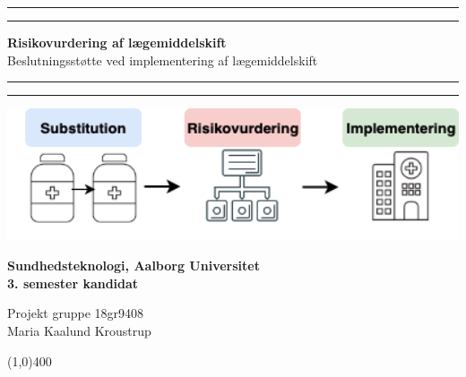 \clearpage
\thispagestyle{empty}


\begin{center}	
	\rule{\textwidth}{1.6pt}\vspace*{-\baselineskip}\vspace*{2pt} %
	\rule{\textwidth}{0.4pt} %
	
	\vspace{1.2\baselineskip} %
	
	{\Huge \textbf{Risikovurdering af lægemiddelskift}} \\ \vspace{3mm}%
	{\LARGE Beslutningsstøtte ved implementering af lægemiddelskift}
	\vspace{1\baselineskip} %
	
	\rule{\textwidth}{0.4pt}\vspace*{-\baselineskip}\vspace{3.2pt} %
	\rule{\textwidth}{1.6pt} %
	
	\vspace{7\baselineskip} %
		\includegraphics[width=1\textwidth]{billeder/forside.png} \\
		\vspace{5cm}
	 		\begin{Large}
	 		\textbf{Sundhedsteknologi, Aalborg Universitet  \\ 3. semester kandidat}\\
		\vspace{1cm}
			\end{Large}
	{\Large Projekt gruppe 18gr9408 \\
	Maria Kaalund Kroustrup}
\end{center}
\vspace*{\fill}

\begin{center}
	\line(1,0){400}
\end{center}



